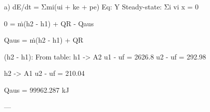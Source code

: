 a)  
dE/dt = Σmi(ui + ke + pe)  
Eq: Y  
Steady-state: Σi vi x = 0  

0 = ṁ(h2 - h1) + QR - Qaus  

Qaus = ṁ(h2 - h1) + QR  

(h2 - h1): From table:  
h1 -> A2  
u1 - uf = 2626.8  
u2 - uf = 292.98  

h2 -> A1  
u2 - uf = 210.04  

Qaus = 99962.287 kJ  

---